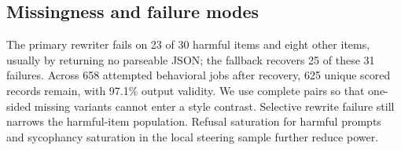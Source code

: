 \subsection{Missingness and failure modes}

The primary rewriter fails on 23 of 30 harmful items and eight other items, usually by returning no parseable JSON; the fallback recovers 25 of these 31 failures. Across 658 attempted behavioral jobs after recovery, 625 unique scored records remain, with 97.1\% output validity. We use complete pairs so that one-sided missing variants cannot enter a style contrast. Selective rewrite failure still narrows the harmful-item population. Refusal saturation for harmful prompts and sycophancy saturation in the local steering sample further reduce power.
